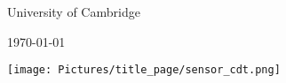 \begin{center}
{\begin{center}
			
			\vspace{1em}
			
			{\Large University of Cambridge} %
			
			\vspace{1em}
			
			
			\vspace{1em}
			
			{\large \today}
			
		\end{center}		
	}
	
	\vspace{1em}
	\texttt{[image: Pictures/title\_page/sensor\_cdt.png]}
	
\end{center}
	
	
\clearpage




%


